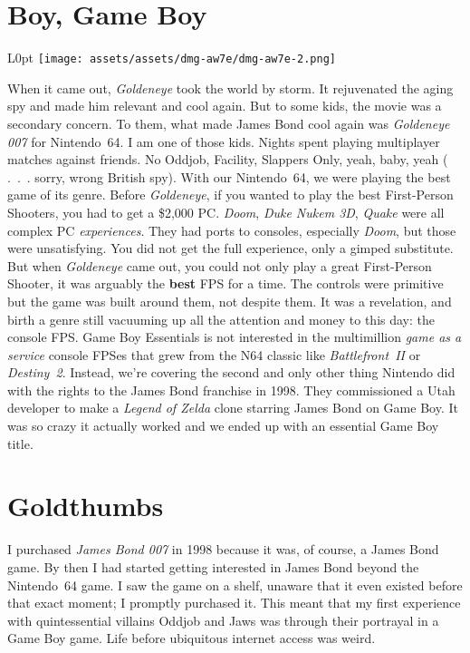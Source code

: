 \documentclass{book}
\begin{document}
\newpage\FloatBarrier\needspace{10mm}\section*{Boy, Game Boy}\nopagebreak[4]
\begin{wrapfigure}{L}{0pt} \texttt{[image: assets/assets/dmg-aw7e/dmg-aw7e-2.png]}\end{wrapfigure}
When it came out, \emph{Goldeneye} took the world by storm. It rejuvenated the aging spy and made him relevant and cool again. But to some kids, the movie was a secondary concern. To them, what made James Bond cool again was \emph{Goldeneye 007} for Nintendo 64. I am one of those kids. Nights spent playing multiplayer matches against friends. No Oddjob, Facility, Slappers Only, yeah, baby, yeah ( . . . sorry, wrong British spy). With our Nintendo 64, we were playing the best game of its genre. Before \emph{Goldeneye}, if you wanted to play the best First-Person Shooters, you had to get a \$2,000 PC. \emph{Doom}, \emph{Duke Nukem 3D}, \emph{Quake} were all complex PC \emph{experiences}. They had ports to consoles, especially \emph{Doom}, but those were unsatisfying. You did not get the full experience, only a gimped substitute. But when \emph{Goldeneye} came out, you could not only play a great First-Person Shooter, it was arguably the \textbf{best} FPS for a time. The controls were primitive but the game was built around them, not despite them. It was a revelation, and birth a genre still vacuuming up all the attention and money to this day: the console FPS. Game Boy Essentials is not interested in the multimillion \emph{game as a service} console FPSes that grew from the N64 classic like \emph{Battlefront II} or \emph{Destiny 2}. Instead, we’re covering the second and only other thing Nintendo did with the rights to the James Bond franchise in 1998. They commissioned a Utah developer to make a \emph{Legend of Zelda} clone starring James Bond on Game Boy. It was so crazy it actually worked and we ended up with an essential Game Boy title.

\FloatBarrier\needspace{10mm}\section*{Goldthumbs}\nopagebreak[4]

I purchased \emph{James Bond 007} in 1998 because it was, of course, a James Bond game. By then I had started getting interested in James Bond beyond the Nintendo 64 game. I saw the game on a shelf, unaware that it even existed before that exact moment; I promptly purchased it. This meant that my first experience with quintessential villains Oddjob and Jaws was through their portrayal in a Game Boy game. Life before ubiquitous internet access was weird.
\end{document}
